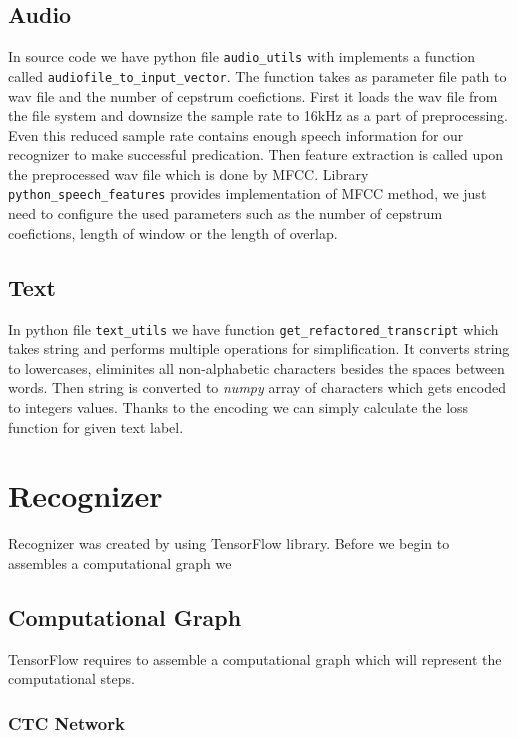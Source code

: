 \subsection{Audio}

In source code we have python file \texttt{audio\_utils} with implements a function called \texttt{audiofile\_to\_input\_vector}.
The function takes as parameter file path to wav file and the number of cepstrum coefictions.
First it loads the wav file from the file system and downsize the sample rate to 16kHz as a part of preprocessing.
Even this reduced sample rate contains enough speech information for our recognizer to make successful predication.
Then feature extraction is called upon the preprocessed wav file which is done by MFCC.
Library \texttt{python\_speech\_features} provides implementation of MFCC method, we just need to configure the used parameters such as the number of cepstrum coefictions, length of window or the length of overlap.

\subsection{Text}

In python file \texttt{text\_utils} we have function \texttt{get\_refactored\_transcript} which takes string and performs multiple operations for simplification.
It converts string to lowercases, eliminites all non-alphabetic characters besides the spaces between words.
Then string is converted to \textit{numpy} array of characters which gets encoded to integers values.
Thanks to the encoding we can simply calculate the loss function for given text label.


\section{Recognizer}

Recognizer was created by using TensorFlow library. Before we begin to assembles a computational graph we

\subsection{Computational Graph}

TensorFlow requires to assemble a computational graph which will represent the computational steps.

\subsubsection{CTC Network}

